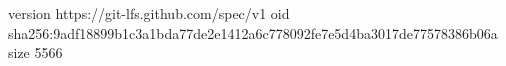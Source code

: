 version https://git-lfs.github.com/spec/v1
oid sha256:9adf18899b1c3a1bda77de2e1412a6c778092fe7e5d4ba3017de77578386b06a
size 5566
